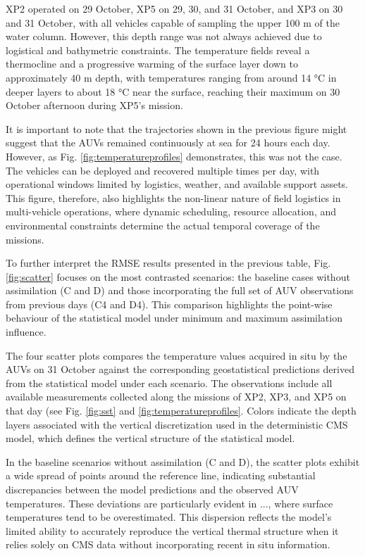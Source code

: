 XP2 operated on 29 October, XP5 on 29, 30, and 31 October, and XP3 on 30
and 31 October, with all vehicles capable of sampling the upper 100 m of
the water column. However, this depth range was not always achieved due
to logistical and bathymetric constraints. The temperature fields reveal
a thermocline and a progressive warming of the surface layer down to
approximately 40 m depth, with temperatures ranging from around 14 °C in
deeper layers to about 18 °C near the surface, reaching their maximum on
30 October afternoon during XP5’s mission.

It is important to note that the trajectories shown in the previous
figure might suggest that the AUVs remained continuously at sea for 24
hours each day. However, as Fig. \ref{fig:temperatureprofiles}
demonstrates, this was not the case. The vehicles can be deployed and
recovered multiple times per day, with operational windows limited by
logistics, weather, and available support assets. This figure,
therefore, also highlights the non-linear nature of field logistics in
multi-vehicle operations, where dynamic scheduling, resource allocation,
and environmental constraints determine the actual temporal coverage of
the missions.


To further interpret the RMSE results presented in the previous table, Fig. \ref{fig:scatter} focuses on the most contrasted scenarios: the baseline cases without assimilation (C and D) and those incorporating the full set of AUV observations from previous days (C4 and D4). This comparison highlights the point-wise behaviour of the statistical model under minimum and maximum assimilation influence.

The four scatter plots compares the temperature values acquired in situ by the AUVs on 31 October against the corresponding geostatistical predictions derived from the statistical model under each scenario. The observations include all available measurements collected along the missions of XP2, XP3, and XP5 on that day (see Fig. \ref{fig:sst} and \ref{fig:temperatureprofiles}. Colors indicate the depth layers associated with the vertical discretization used in the deterministic CMS model, which defines the vertical structure of the statistical model. 

In the baseline scenarios without assimilation (C and D), the scatter plots exhibit a wide spread of points around the reference line, indicating substantial discrepancies between the model predictions and the observed AUV temperatures. These deviations are particularly evident in ..., where surface temperatures tend to be overestimated. This dispersion reflects the model’s limited ability to accurately reproduce the vertical thermal structure when it relies solely on CMS data without incorporating recent in situ information. 

